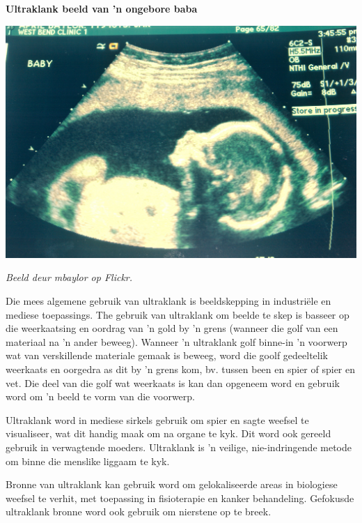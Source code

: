 \begin{minipage}{.5\textwidth}
\begin{center}
\textbf{Ultraklank beeld van 'n ongebore baba}\par
\includegraphics[width=.8\columnwidth]{../Grade10/photos/ultrasound_mbaylor_flickr.jpg}
\par\textit{Beeld deur mbaylor op Flickr.}
\end{center}
\end{minipage}
\begin{minipage}{.5\textwidth}

Die mees algemene gebruik van ultraklank is beeldskepping in industri\"ele en mediese toepassings. The gebruik van ultraklank om beelde te skep is basseer op die weerkaatsing en oordrag van 'n gold by 'n grens (wanneer die golf van een materiaal na 'n ander beweeg). Wanneer 'n ultraklank golf binne-in 'n voorwerp wat van verskillende materiale gemaak is beweeg, word die goolf gedeeltelik weerkaats en oorgedra as dit by 'n grens kom, bv. tussen been en spier of spier en vet. Die deel van die golf wat weerkaats is kan dan opgeneem word en gebruik word om 'n beeld te vorm van die voorwerp. \par

Ultraklank word in mediese sirkels gebruik om spier en sagte weefsel te visualiseer, wat dit handig maak om na organe te kyk. Dit word ook gereeld gebruik in verwagtende moeders. Ultraklank is 'n veilige, nie-indringende metode om binne die menslike liggaam te kyk. \par
      
\end{minipage}

Bronne van ultraklank kan gebruik word om gelokaliseerde areas in biologiese weefsel te verhit, met toepassing in fisioterapie en kanker behandeling. Gefokusde ultraklank bronne word ook gebruik om nierstene op te breek.\par

